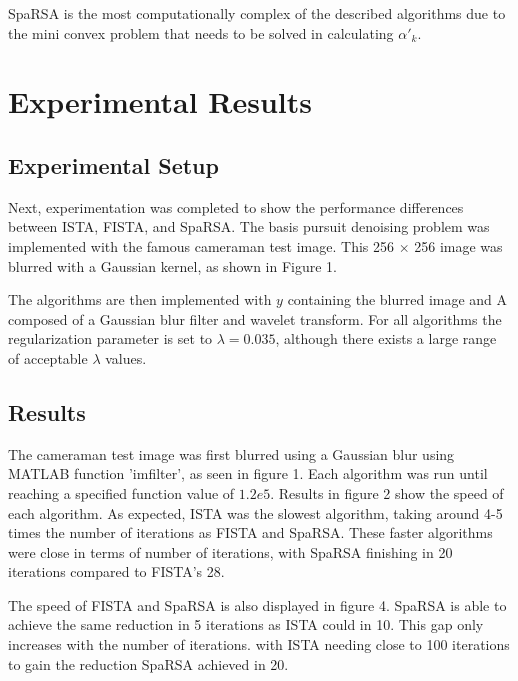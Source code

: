 \documentclass[10pt]{article} %
\begin{document}
SpaRSA is the most computationally complex of the described algorithms due to the mini convex problem that needs to be solved in calculating $\alpha'_k$. 

\vspace{\baselineskip}


\section{Experimental Results}

\subsection{Experimental Setup}

Next, experimentation was completed to show the performance differences between ISTA, FISTA, and SpaRSA. The basis pursuit denoising problem was implemented with the famous cameraman test image. This 256 $\times$ 256 image was blurred with a Gaussian kernel, as shown in Figure 1. 

The algorithms are then implemented with $y$ containing the blurred image and A composed of a Gaussian blur filter and wavelet transform. For all algorithms the regularization parameter is set to $\lambda = 0.035$, although there exists a large range of acceptable $\lambda$ values. 

\subsection{Results}

The cameraman test image was first blurred using a Gaussian blur using MATLAB function 'imfilter', as seen in figure 1. Each algorithm was run until reaching a specified function value of $1.2e5$. Results in figure 2 show the speed of each algorithm. As expected, ISTA was the slowest algorithm, taking around 4-5 times the number of iterations as FISTA and SpaRSA. These faster algorithms were close in terms of number of iterations, with SpaRSA finishing in 20 iterations compared to FISTA's 28. 

The speed of FISTA and SpaRSA is also displayed in figure 4. SpaRSA is able to achieve the same reduction in 5 iterations as ISTA could in 10. This gap only increases with the number of iterations. with ISTA needing close to 100 iterations to gain the reduction SpaRSA achieved in 20. 
\end{document}
